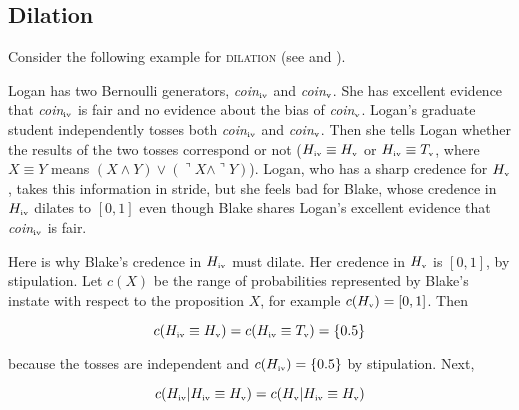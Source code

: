 \documentclass[11pt]{article}
\begin{document}
\subsection{Dilation}
\label{dilation}

Consider the following example for \textsc{dilation} (see
 and ).

\begin{quotex}
  \label{ex:dilation} Logan has two Bernoulli
  generators, \textit{coin}$_{\mbox{\tiny{iv}}}$ and
  \textit{coin}$_{\mbox{\tiny{v}}}$. She has excellent evidence that
  \textit{coin}$_{\mbox{\tiny{iv}}}$ is fair and no evidence about the
  bias of \textit{coin}$_{\mbox{\tiny{v}}}$. Logan's graduate student
  independently tosses both \textit{coin}$_{\mbox{\tiny{iv}}}$ and
  \textit{coin}$_{\mbox{\tiny{v}}}$. Then she tells Logan whether the
  results of the two tosses correspond or not
  ($H_{\mbox{\tiny{iv}}}\equiv{}H_{\mbox{\tiny{v}}}$ or
  $H_{\mbox{\tiny{iv}}}\equiv{}T_{\mbox{\tiny{v}}}$, where
  $X\equiv{}Y$ means
  $(X\wedge{}Y)\vee(\urcorner{}X\wedge\urcorner{}Y)$). Logan, who has
  a sharp credence for $H_{\mbox{\tiny{v}}}$, takes this information
  in stride, but she feels bad for Blake, whose credence in
  $H_{\mbox{\tiny{iv}}}$ dilates to $[0,1]$ even though Blake shares
  Logan's excellent evidence that \textit{coin}$_{\mbox{\tiny{iv}}}$
  is fair.
\end{quotex}

Here is why Blake's credence in $H_{\mbox{\tiny{iv}}}$ must dilate.
Her credence in $H_{\mbox{\tiny{v}}}$ is $[0,1]$, by stipulation. Let
$c(X)$ be the range of probabilities represented by Blake's instate
with respect to the proposition $X$, for example
$c(H_{\mbox{\tiny{v}}})=[0,1]$. Then

\begin{equation}
  \label{eq:d1}
  c(H_{\mbox{\tiny{iv}}}\equiv{}H_{\mbox{\tiny{v}}})=c(H_{\mbox{\tiny{iv}}}\equiv{}T_{\mbox{\tiny{v}}})=\{0.5\}
\end{equation}

because the tosses are independent and
$c(H_{\mbox{\tiny{iv}}})=\{0.5\}$ by stipulation. Next,

\begin{equation}
  \label{eq:d2}
  c(H_{\mbox{\tiny{iv}}}|H_{\mbox{\tiny{iv}}}\equiv{}H_{\mbox{\tiny{v}}})=c(H_{\mbox{\tiny{v}}}|H_{\mbox{\tiny{iv}}}\equiv{}H_{\mbox{\tiny{v}}})
\end{equation}
\end{document}
